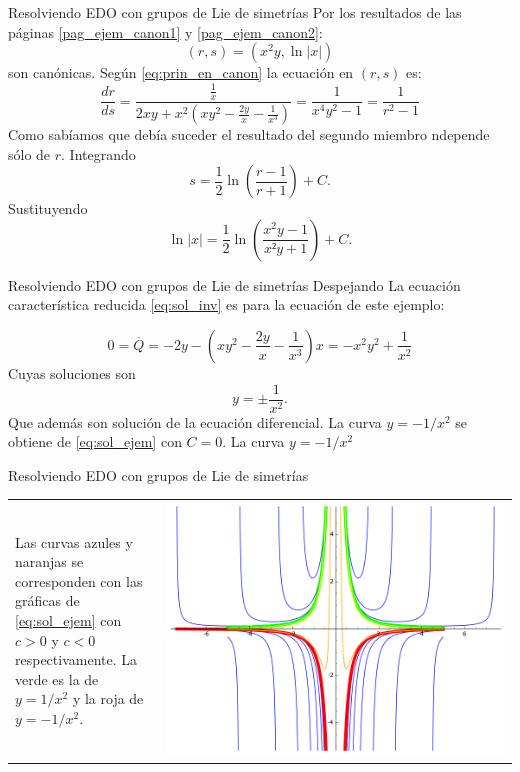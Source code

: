 \documentclass[handout,hyperref={colorlinks=true}]{beamer}
\begin{document}
\begin{frame}{Resolviendo EDO con grupos de Lie de simetrías}
\onslide<+->Por los resultados de las páginas \ref{pag_ejem_canon1} y \ref{pag_ejem_canon2}:
\[(r,s)=(x^2y,\ln|x|)\]
son canónicas.
\onslide<+-> Según \eqref{eq:prin_en_canon} la ecuación en $(r,s)$ es:
\[\frac{dr}{ds}=\frac{\frac{1}{x}}{2xy+x^2\left(  xy^2-\frac{2y}{x}-\frac{1}{x^3}     \right)}=\frac{1}{x^4y^2-1}=\frac{1}{r^2-1}\]
Como sabíamos que debía suceder el resultado del segundo miembro ndepende sólo de $r$. Integrando
\[s=\frac12\ln\left( \frac{r-1}{r+1}  \right)+C.\]
Sustituyendo
\[\ln|x|=\frac12\ln\left( \frac{x^2y-1}{x²y+1}  \right)+C.\]



\end{frame}


\begin{frame}{Resolviendo EDO con grupos de Lie de simetrías}
Despejando
La ecuación característica reducida \eqref{eq:sol_inv} es para la ecuación de este ejemplo:

\[0=\overline{Q}=-2y- \left(xy^2-\frac{2y}{x}-\frac{1}{x^3}  \right)x=-x^2y^2+\frac{1}{x^2}\]
Cuyas soluciones son
\[y=\pm\frac{1}{x^2}.\]
Que además son solución de la ecuación diferencial. La curva $y=-1/x^2$ se obtiene de \eqref{eq:sol_ejem} con $C=0$. La  curva $y=-1/x^2$

\end{frame}


\begin{frame}{Resolviendo EDO con grupos de Lie de simetrías}

\begin{tabular}{m{0.3\linewidth} >{\centering\arraybackslash}m{0.7\linewidth} }
Las curvas azules y naranjas se corresponden con las gráficas de \eqref{eq:sol_ejem} con $c>0$ y $c<0$ respectivamente. La verde es la de $y=1/x^2$ y la roja de $y=-1/x^2$.
&
\includegraphics[scale=.4]{imagenes/SolGrup.png}
\end{tabular}
\end{frame}
\end{document}
